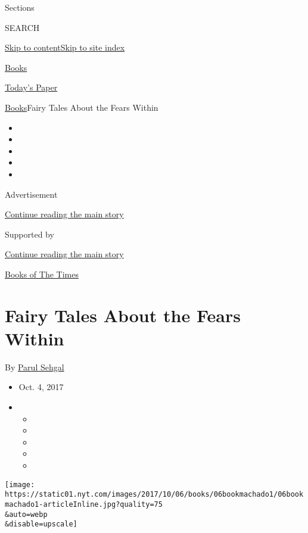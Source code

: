 Sections

SEARCH

\protect\hyperlink{site-content}{Skip to
content}\protect\hyperlink{site-index}{Skip to site index}

\href{https://www.nytimes.com/section/books}{Books}

\href{https://myaccount.nytimes.com/auth/login?response_type=cookie\&client_id=vi}{}

\href{https://www.nytimes.com/section/todayspaper}{Today's Paper}

\href{/section/books}{Books}\textbar{}Fairy Tales About the Fears Within

\begin{itemize}
\item
\item
\item
\item
\item
\end{itemize}

Advertisement

\protect\hyperlink{after-top}{Continue reading the main story}

Supported by

\protect\hyperlink{after-sponsor}{Continue reading the main story}

\href{/column/books-of-the-times}{Books of The Times}

\hypertarget{fairy-tales-about-the-fears-within}{%
\section{Fairy Tales About the Fears
Within}\label{fairy-tales-about-the-fears-within}}

By \href{https://www.nytimes.com/by/parul-sehgal}{Parul Sehgal}

\begin{itemize}
\item
  Oct. 4, 2017
\item
  \begin{itemize}
  \item
  \item
  \item
  \item
  \item
  \end{itemize}
\end{itemize}

\texttt{[image: https://static01.nyt.com/images/2017/10/06/books/06bookmachado1/06bookmachado1-articleInline.jpg?quality=75\\\&auto=webp\\\&disable=upscale]}

